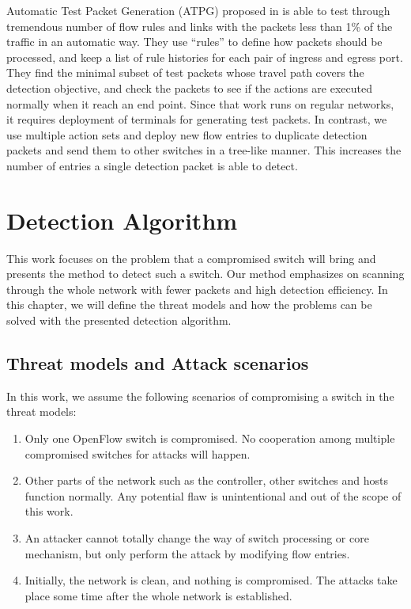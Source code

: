 \documentclass[conference]{IEEEtran}
\begin{document}
Automatic Test Packet Generation (ATPG) proposed in \cite{ZKVM12} is able to test through tremendous number of flow rules and links with the packets less than 1\% of the traffic in an automatic way. They use ``rules'' to define how packets should be processed, and keep a list of rule histories for each pair of ingress and egress port. They find the minimal subset of test packets whose travel path covers the detection objective, and check the packets to see if the actions are executed normally when it reach an end point. Since that work runs on regular networks, it requires deployment of terminals for generating test packets. In contrast, we use multiple action sets and deploy new flow entries to duplicate detection packets and send them to other switches in a tree-like manner. This increases the number of entries a single detection packet is able to detect. 

\section{Detection Algorithm}
This work focuses on the problem that a compromised switch will bring and presents the method to detect such a switch. Our method emphasizes on scanning through the whole network with fewer packets and high detection efficiency. In this chapter, we will define the threat models and how the problems can be solved with the presented detection algorithm.

\subsection{Threat models and Attack scenarios}
In this work, we assume the following scenarios of compromising a switch in the threat models:
\begin{enumerate}
\item
Only one OpenFlow switch is compromised. No cooperation among multiple compromised switches for attacks will happen.
\item
Other parts of the network such as the controller, other switches and hosts function normally. Any potential flaw is unintentional and out of the scope of this work.
\item
An attacker cannot totally change the way of switch processing or core mechanism, but only perform the attack by modifying flow entries.
\item
Initially, the network is clean, and nothing is compromised. The attacks take place some time after the whole network is established.
\end{enumerate}
\end{document}
